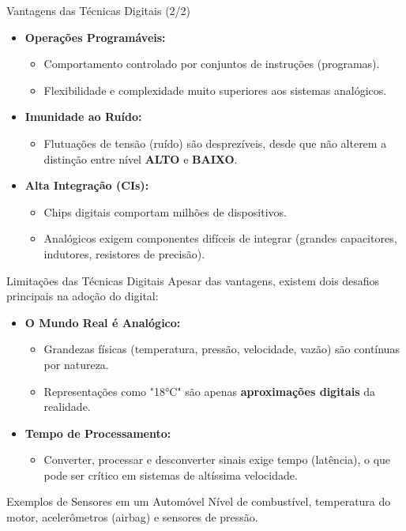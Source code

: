\begin{frame}{Vantagens das Técnicas Digitais (2/2)}
    \begin{itemize}
        \item \textbf{Operações Programáveis:}
              \begin{itemize}
                  \item Comportamento controlado por conjuntos de instruções (programas).
                  \item Flexibilidade e complexidade muito superiores aos sistemas analógicos.
              \end{itemize}
        \item \textbf{Imunidade ao Ruído:}
              \begin{itemize}
                  \item Flutuações de tensão (ruído) são desprezíveis, desde que não alterem a distinção entre nível \textbf{ALTO} e \textbf{BAIXO}.
              \end{itemize}

        \item \textbf{Alta Integração (CIs):}
              \begin{itemize}
                  \item Chips digitais comportam milhões de dispositivos.
                  \item Analógicos exigem componentes difíceis de integrar (grandes capacitores, indutores, resistores de precisão).
              \end{itemize}
    \end{itemize}
\end{frame}

\begin{frame}{Limitações das Técnicas Digitais}
    Apesar das vantagens, existem dois desafios principais na adoção do digital:
    \begin{itemize}
        \item \textbf{O Mundo Real é Analógico:}
              \begin{itemize}
                  \item Grandezas físicas (temperatura, pressão, velocidade, vazão) são contínuas por natureza.
                  \item Representações como "18°C" são apenas \textbf{aproximações digitais} da realidade.
              \end{itemize}
        \item \textbf{Tempo de Processamento:}
              \begin{itemize}
                  \item Converter, processar e desconverter sinais exige tempo (latência), o que pode ser crítico em sistemas de altíssima velocidade.
              \end{itemize}
    \end{itemize}
    \begin{exampleblock}{Exemplos de Sensores em um Automóvel}
        Nível de combustível, temperatura do motor, acelerômetros (airbag) e sensores de pressão.
    \end{exampleblock}
\end{frame}

